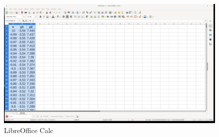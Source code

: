 \begin{figure}[h!]		
	\centering
   	\includegraphics[width=8.0in]{pictures/picture_013.png}
  	\caption{LibreOffice Calc}
   	\label{fig:LibreOfficeCalc013}
\end{figure}